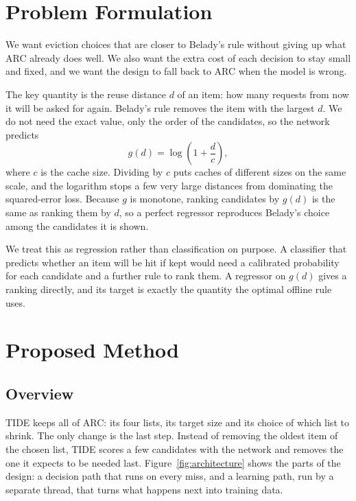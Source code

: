 \documentclass{llncs}
\begin{document}
\section{Problem Formulation}
\label{sec:problem}

We want eviction choices that are closer to Belady's rule without giving up what ARC already does well. We also want the extra cost of each decision to stay small and fixed, and we want the design to fall back to ARC when the model is wrong.

The key quantity is the reuse distance $d$ of an item: how many requests from now it will be asked for again. Belady's rule removes the item with the largest $d$. We do not need the exact value, only the order of the candidates, so the network predicts
\begin{equation}
g(d) = \log\left(1 + \frac{d}{c}\right),
\label{eq:target}
\end{equation}
where $c$ is the cache size. Dividing by $c$ puts caches of different sizes on the same scale, and the logarithm stops a few very large distances from dominating the squared-error loss. Because $g$ is monotone, ranking candidates by $g(d)$ is the same as ranking them by $d$, so a perfect regressor reproduces Belady's choice among the candidates it is shown.

We treat this as regression rather than classification on purpose. A classifier that predicts whether an item will be hit if kept would need a calibrated probability for each candidate and a further rule to rank them. A regressor on $g(d)$ gives a ranking directly, and its target is exactly the quantity the optimal offline rule uses.

\section{Proposed Method}
\label{sec:design}

\subsection{Overview}

TIDE keeps all of ARC: its four lists, its target size and its choice of which list to shrink. The only change is the last step. Instead of removing the oldest item of the chosen list, TIDE scores a few candidates with the network and removes the one it expects to be needed last. Figure~\ref{fig:architecture} shows the parts of the design: a decision path that runs on every miss, and a learning path, run by a separate thread, that turns what happens next into training data.
\end{document}

